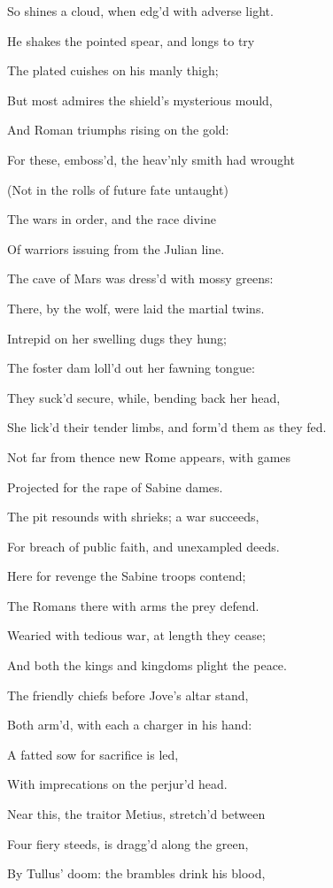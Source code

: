 So shines a cloud, when edg’d with adverse light.

He shakes the pointed spear, and longs to try

The plated cuishes on his manly thigh;

But most admires the shield’s mysterious mould,

And Roman triumphs rising on the gold:

For these, emboss’d, the heav’nly smith had wrought

(Not in the rolls of future fate untaught)

The wars in order, and the race divine

Of warriors issuing from the Julian line.

The cave of Mars was dress’d with mossy greens:

There, by the wolf, were laid the martial twins.

Intrepid on her swelling dugs they hung;

The foster dam loll’d out her fawning tongue:

They suck’d secure, while, bending back her head,

She lick’d their tender limbs, and form’d them as they fed.

Not far from thence new Rome appears, with games

Projected for the rape of Sabine dames.

The pit resounds with shrieks; a war succeeds,

For breach of public faith, and unexampled deeds.

Here for revenge the Sabine troops contend;

The Romans there with arms the prey defend.

Wearied with tedious war, at length they cease;

And both the kings and kingdoms plight the peace.

The friendly chiefs before Jove’s altar stand,

Both arm’d, with each a charger in his hand:

A fatted sow for sacrifice is led,

With imprecations on the perjur’d head.

Near this, the traitor Metius, stretch’d between

Four fiery steeds, is dragg’d along the green,

By Tullus’ doom: the brambles drink his blood,


